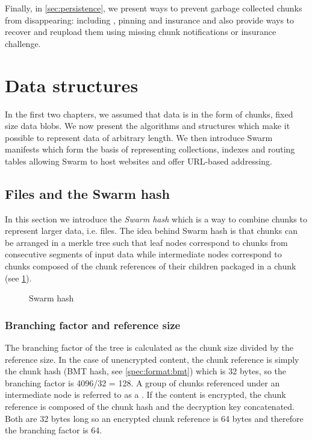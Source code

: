 Finally, in \ref{sec:persistence}, we present ways to prevent garbage collected chunks from disappearing: including , pinning and insurance and also provide ways to recover and reupload them using missing chunk notifications or insurance challenge. 

\section{Data structures}\label{sec:datastructures}

In the first two chapters, we assumed that data is in the form of chunks, fixed size data blobs. We now present the algorithms and structures which make it possible to represent data of arbitrary length. We then introduce Swarm manifests which form the basis of representing  collections, indexes and routing tables allowing Swarm to host websites and offer URL-based addressing.

\subsection{Files and the Swarm hash}\label{sec:files}

In this section we introduce the \emph{Swarm hash} which is a way to combine chunks to represent larger data, i.e. files. The idea behind Swarm hash is that chunks can be arranged in a merkle tree such that leaf nodes correspond to chunks from consecutive segments of input data while intermediate nodes correspond to chunks composed of the chunk references of their children packaged in a chunk (see \ref{fig:Swarm-hash}). 



\begin{figure}[htbp]
\centering
\resizebox{1\textwidth}{!}{
    
}
\caption[Swarm hash]{Swarm hash}
\label{fig:Swarm-hash}
\end{figure}

\subsubsection{Branching factor and reference size}

The branching factor of the tree is calculated as the chunk size divided by the reference size. In the case of unencrypted content, the chunk reference is simply the chunk hash (BMT hash, see \ref{spec:format:bmt}) which is 32 bytes, so the branching factor is 4096/32 =  128. A group of chunks referenced under an intermediate node is referred to as a . If the content is encrypted, the chunk reference is  composed of the chunk hash and the decryption key concatenated. Both are 32 bytes long so an encrypted chunk reference is 64 bytes and therefore the branching factor is 64. 

